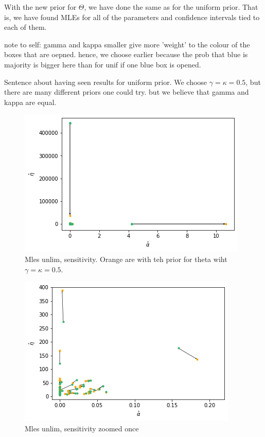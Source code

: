 With the new prior for $\Theta$, we have done the same as for the uniform prior. That is, we have found MLEs for all of the parameters and confidence intervals tied to each of them. 



note to self: gamma and kappa smaller give more 'weight' to the colour of the boxes that are oepned. hence, we choose earlier because the prob that blue is majority is bigger here than for unif if one blue box is opened. 

Sentence about having seen results for uniform prior. We choose $\gamma=\kappa=0.5$, but there are many different priors one could try. but we believe that gamma and kappa are equal. 

\begin{figure}
    \centering
    \includegraphics[scale=0.7]{pictures/Sensitivity/mles_unlim.png}
    \caption{Mles unlim, sensitivity. Orange are with teh prior for theta wiht $\gamma=\kappa=0.5$. }
    \label{fig:sensitivity_mls_unlim}
\end{figure}


\begin{figure}
    \centering
    \includegraphics[scale=0.8]{pictures/Sensitivity/mles_unlim_zoom1.png}
    \caption{Mles unlim, sensitivity zoomed once}
    \label{fig:sensitivity_mls_unlim_zoom1}
\end{figure}

